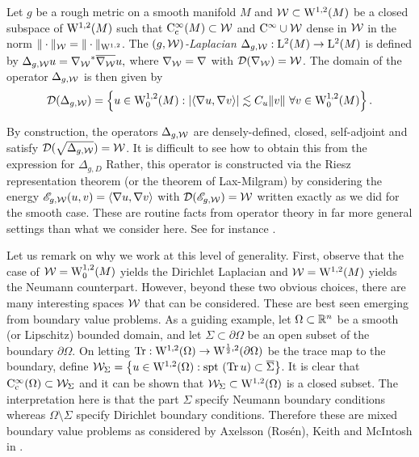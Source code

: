 \documentclass[a4paper, 12pt]{amsart}
\begin{document}
\begin{defn}[$(g,\cW)$-Laplacian]
Let \(g\) be a rough metric on a smooth manifold \(M\)
and $\cW \subset \SobH{1}(M)$ be a closed subspace
of $\SobH{1}(M)$ such that $\Ck[c]{\infty}(M) \subset \cW$
and $\Ck{\infty} \cup \cW$ dense in $\cW$ 
in the norm $\norm{\cdot}_{\cW} = \norm{\cdot}_{\SobH{1}}$. 
The \emph{$(g,\cW)$-Laplacian}
\(\Delta_{g,\cW} : \Lp{2}(M) \to \Lp{2}(M)\) is defined by
$\Delta_{g,\cW} u = \adj{\nabla_{\cW}} \close{ \nabla_{\cW}} u,$
where  $\nabla_{\cW} = \nabla$ with $\dom(\nabla_{\cW}) = \cW$. 
The domain of the operator $\Delta_{g,\cW}$ is then given by
$$\dom(\Delta_{g,\cW}) = \set{u \in \SobH[0]{1}(M): \modulus{\inprod{\nabla u, \nabla v}} \lesssim C_u \norm{v}\ \forall v \in \SobH[0]{1}(M)}.$$
\end{defn}

By construction, the  operators $\Delta_{g,\cW}$ 
are densely-defined, closed, self-adjoint and satisfy 
$\dom(\sqrt{\Delta_{g,\cW}}) = \cW$.
It is difficult to see how to obtain this from the expression for $\Delta_{g,D}$
Rather, this operator is constructed via the Riesz representation
theorem (or the theorem of Lax-Milgram) by considering the
energy $\sE_{g,\cW}(u,v) = \inprod{\nabla u, \nabla v}$ 
with $\dom(\sE_{g,\cW}) = \cW$ written exactly as we did for the smooth case.
These are routine facts from operator theory in far more general 
settings than what we consider here. See for instance 
\cite{Yosida, Kato}.

Let us remark on why we work at this level 
of generality. First, observe that the case of $\cW = \SobH[0]{1}(M)$
yields the Dirichlet Laplacian
and $\cW = \SobH{1}(M)$ yields the Neumann counterpart.
However, beyond these two obvious choices, 
there are many interesting spaces $\cW$ that
can be considered. These are best
seen emerging from boundary value problems.
As a guiding example, let $\Omega \subset \R^n$
be a smooth (or Lipschitz) bounded domain, and let $\Sigma \subset \partial \Omega$
be an open subset of the boundary $\partial \Omega$.
On letting $\Tr: \SobH{1}(\Omega) \to \SobH{\frac{1}{2}}(\partial \Omega)$
be the trace map to the boundary, define 
$\cW_{\Sigma} = \set{u \in \SobH{1}(\Omega): \spt (\Tr u) \subset \close{\Sigma}}$. 
It is clear that $\Ck[c]{\infty}(\Omega) \subset \cW_{\Sigma}$ and
it can be shown that $\cW_{\Sigma} \subset \SobH{1}(\Omega)$
is a closed subset. 
The interpretation here is that the part $\Sigma$ 
specify Neumann boundary conditions whereas $\Omega \setminus \Sigma$
specify Dirichlet boundary conditions. Therefore
these are mixed boundary value problems as considered
by  Axelsson (Rosén), Keith and McIntosh in \cite{AKM2}.
\end{document}
